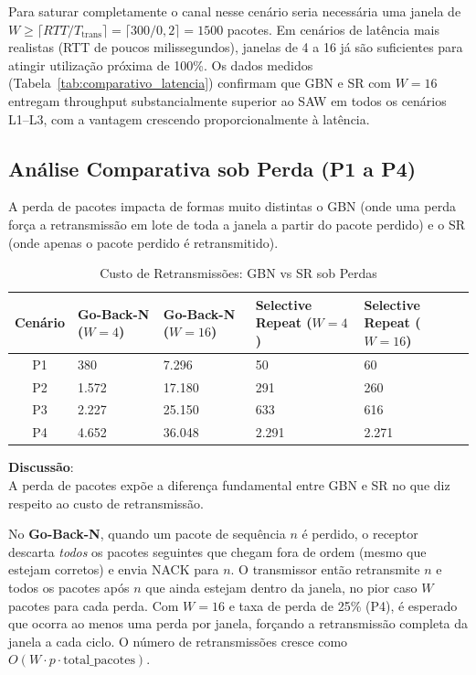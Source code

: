 \documentclass[12pt,a4paper]{article}
\begin{document}
Para saturar completamente o canal nesse cenário seria necessária uma janela de $W \geq \lceil RTT / T_{\text{trans}} \rceil = \lceil 300 / 0{,}2 \rceil = 1500$ pacotes. Em cenários de latência mais realistas (RTT de poucos milissegundos), janelas de 4 a 16 já são suficientes para atingir utilização próxima de 100\%. Os dados medidos (Tabela~\ref{tab:comparativo_latencia}) confirmam que GBN e SR com $W = 16$ entregam throughput substancialmente superior ao SAW em todos os cenários L1--L3, com a vantagem crescendo proporcionalmente à latência.

\subsection{Análise Comparativa sob Perda (P1 a P4)}
A perda de pacotes impacta de formas muito distintas o GBN (onde uma perda força a retransmissão em lote de toda a janela a partir do pacote perdido) e o SR (onde apenas o pacote perdido é retransmitido).

\begin{table}[H]
    \centering
    \caption{Custo de Retransmissões: GBN vs SR sob Perdas}
    \begin{tabularx}{\textwidth}{c*{4}{Y}}
        \toprule
        \textbf{Cenário} & \textbf{Go-Back-N ($W=4$)} & \textbf{Go-Back-N ($W=16$)} & \textbf{Selective Repeat ($W=4$)} & \textbf{Selective Repeat ($W=16$)} \\
        \midrule
        P1 & 380    & 7.296   & 50    & 60    \\
        P2 & 1.572  & 17.180  & 291   & 260   \\
        P3 & 2.227  & 25.150  & 633   & 616   \\
        P4 & 4.652  & 36.048  & 2.291 & 2.271 \\
        \bottomrule
    \end{tabularx}
    \label{tab:comparativo_perdas}
\end{table}

\noindent \textbf{Discussão}:
\\
A perda de pacotes expõe a diferença fundamental entre GBN e SR no que diz respeito ao custo de retransmissão.

No \textbf{Go-Back-N}, quando um pacote de sequência $n$ é perdido, o receptor descarta \emph{todos} os pacotes seguintes que chegam fora de ordem (mesmo que estejam corretos) e envia NACK para $n$. O transmissor então retransmite $n$ e todos os pacotes após $n$ que ainda estejam dentro da janela, no pior caso $W$ pacotes para cada perda. Com $W = 16$ e taxa de perda de 25\% (P4), é esperado que ocorra ao menos uma perda por janela, forçando a retransmissão completa da janela a cada ciclo. O número de retransmissões cresce como $O(W \cdot p \cdot \text{total\_pacotes})$.
\end{document}
